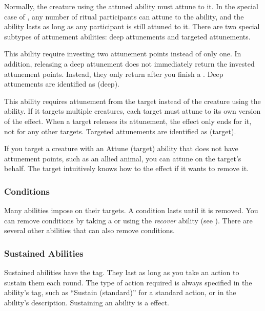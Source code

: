       Normally, the creature using the attuned ability must attune to it.
      In the special case of , any number of ritual participants can attune to the ability, and the ability lasts as long as any participant is still attuned to it.
      There are two special subtypes of attunement abilities: deep attunements and targeted attunements.

       This ability require investing two attunement points instead of only one.
      In addition, releasing a deep attunement does not immediately return the invested attunement points.
      Instead, they only return after you finish a .
      Deep attunements are identified as  (deep).

       This ability requires attunement from the target instead of the creature using the ability.
      If it targets multiple creatures, each target must attune to its own version of the effect.
      When a target releases its attunement, the effect only ends for it, not for any other targets.
      Targeted attunements are identified as  (target).

      If you target a creature with an Attune (target) ability that does not have attunement points, such as an allied animal, you can attune on the target's behalf.
      The target intuitively knows how to  the effect if it wants to remove it.

    \subsubsection{Conditions}\label{Conditions}
      Many abilities impose  on their targets.
      A condition lasts until it is removed.
      You can remove conditions by taking a  or using the \textit{recover} ability (see ).
      There are several other abilities that can also remove conditions.

    \subsubsection{Sustained Abilities}\label{Sustained Abilities}
      Sustained abilities have the  tag.
      They last as long as you take an action to sustain them each round.
      The type of action required is always specified in the ability's tag, such as ``Sustain (standard)'' for a standard action, or in the ability's description.
      Sustaining an ability is a \atSwift effect.

